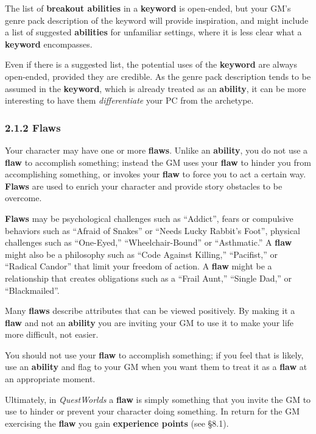 \documentclass[
  11pt,
]{article}
\begin{document}
The list of \textbf{breakout abilities} in a \textbf{keyword} is
open-ended, but your GM's genre pack description of the keyword will
provide inspiration, and might include a list of suggested
\textbf{abilities} for unfamiliar settings, where it is less clear what
a \textbf{keyword} encompasses.

Even if there is a suggested list, the potential uses of the
\textbf{keyword} are always open-ended, provided they are credible. As
the genre pack description tends to be assumed in the \textbf{keyword},
which is already treated as an \textbf{ability}, it can be more
interesting to have them \emph{differentiate} your PC from the
archetype.

\hypertarget{flaws}{%
\subsubsection{2.1.2 Flaws}\label{flaws}}

Your character may have one or more \textbf{flaws}. Unlike an
\textbf{ability}, you do not use a \textbf{flaw} to accomplish
something; instead the GM uses your \textbf{flaw} to hinder you from
accomplishing something, or invokes your \textbf{flaw} to force you to
act a certain way. \textbf{Flaws} are used to enrich your character and
provide story obstacles to be overcome.

\textbf{Flaws} may be psychological challenges such as ``Addict'', fears
or compulsive behaviors such as ``Afraid of Snakes'' or ``Needs Lucky
Rabbit's Foot'', physical challenges such as ``One-Eyed,''
``Wheelchair-Bound'' or ``Asthmatic.'' A \textbf{flaw} might also be a
philosophy such as ``Code Against Killing,'' ``Pacifist,'' or ``Radical
Candor'' that limit your freedom of action. A \textbf{flaw} might be a
relationship that creates obligations such as a ``Frail Aunt,'' ``Single
Dad,'' or ``Blackmailed''.

Many \textbf{flaws} describe attributes that can be viewed positively.
By making it a \textbf{flaw} and not an \textbf{ability} you are
inviting your GM to use it to make your life more difficult, not easier.

You should not use your \textbf{flaw} to accomplish something; if you
feel that is likely, use an \textbf{ability} and flag to your GM when
you want them to treat it as a \textbf{flaw} at an appropriate moment.

Ultimately, in \emph{QuestWorlds} a \textbf{flaw} is simply something
that you invite the GM to use to hinder or prevent your character doing
something. In return for the GM exercising the \textbf{flaw} you gain
\textbf{experience points} (see §8.1).
\end{document}
